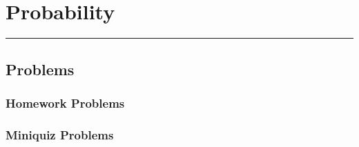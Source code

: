 
\newcommand{\IQ}{\text{IQ\@\xspace}}

\usenotesproblems
\renewcommand{\linput}[1]{}

\chapter{Probability}

\instatements{\linput{Section1000}}

\instatements{\linput{Section1001}}
\startclassproblems

\instatements{\linput{Section1002}}
\startclassproblems

\instatements{\linput{Section1003}}
\startclassproblems

\instatements{\linput{Section1004}}
\startclassproblems

\instatements{\linput{Section1005}}
\startclassproblems

\instatements{\linput{Section1006}}
\startclassproblems

\instatements{\linput{Section1007}}
\startclassproblems

\instatements{\linput{Section1008}}
\startclassproblems

\instatements{\linput{Section1009}}
\startclassproblems

\instatements{\linput{Section1010}}
\startclassproblems

\instatements{\linput{Section1011}}
\startclassproblems

\instatements{\linput{Section1012}}
\startclassproblems

\instatements{\linput{Section1013}}

\rule{\textwidth}{0.01in}\par
\nointerlineskip
\section{Problems}

\subsection*{Homework Problems}
\clearpage

\subsection*{Miniquiz Problems}
\clearpage

\endinput